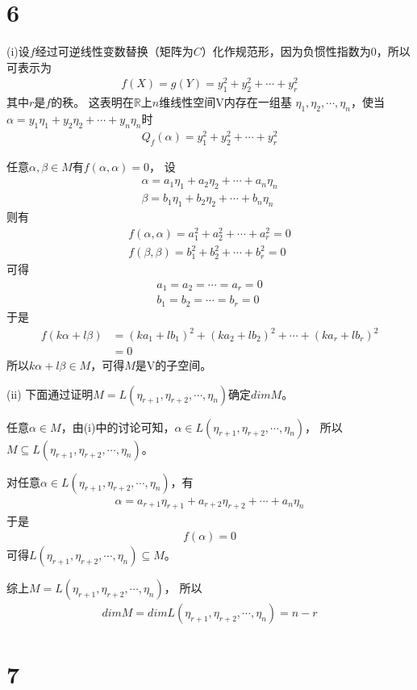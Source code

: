 \documentclass{article}
\begin{document}
\section*{6}

(i)设$f$经过可逆线性变数替换（矩阵为$C$）化作规范形，因为负惯性指数为0，所以可表示为
\begin{align*}
  f(X) = g(Y) = y_1^2 + y_2^2 + \cdots + y_r^2
\end{align*}
其中$r$是$f$的秩。
这表明在$\mathbb{R}$上$n$维线性空间V内存在一组基
$\eta_1, \eta_2, \cdots, \eta_n$，使当$\alpha = y_1 \eta_1 + y_2 \eta_2 + \cdots + y_n \eta_n$时
\begin{align*}
  Q_f(\alpha) = y_1^2 + y_2^2 + \cdots + y_r^2
\end{align*}

任意$\alpha, \beta \in M$有$f(\alpha, \alpha) = 0$，
设
\begin{align*}
  \alpha = a_1 \eta_1 + a_2 \eta_2 + \cdots + a_n \eta_n \\
  \beta = b_1 \eta_1 + b_2 \eta_2 + \cdots + b_n \eta_n
\end{align*}
则有
\begin{align*}
  f(\alpha, \alpha) = a_1^2 + a_2^2 + \cdots + a_r^2 = 0 \\
  f(\beta, \beta) = b_1^2 + b_2^2 + \cdots + b_r^2 = 0
\end{align*}
可得
\begin{align*}
  a_1 = a_2 = \cdots = a_r = 0 \\
  b_1 = b_2 = \cdots = b_r = 0
\end{align*}
于是
\begin{align*}
  f(k\alpha + l\beta)
   & = (k a_1 + l b_1)^2 + (k a_2 + l b_2)^2 + \cdots + (k a_r + l b_r)^2 \\
   & = 0
\end{align*}
所以$k \alpha + l \beta \in M$，可得$M$是V的子空间。

(ii) 下面通过证明$M = L(\eta_{r+1}, \eta_{r+2}, \cdots, \eta_n)$确定$dim M$。

任意$\alpha \in M$，由(i)中的讨论可知，$\alpha \in L(\eta_{r+1}, \eta_{r+2}, \cdots, \eta_n)$，
所以$M \subseteq L(\eta_{r+1}, \eta_{r+2}, \cdots, \eta_n)$。

对任意$\alpha \in L(\eta_{r+1}, \eta_{r+2}, \cdots, \eta_n)$，有 
\begin{align*}
  \alpha = a_{r+1} \eta_{r+1} + a_{r+2} \eta_{r+2} + \cdots + a_n \eta_n
\end{align*}
于是
\begin{align*}
  f(\alpha) = 0
\end{align*}
可得$L(\eta_{r+1}, \eta_{r+2}, \cdots, \eta_n) \subseteq M$。

综上$M = L(\eta_{r+1}, \eta_{r+2}, \cdots, \eta_n)$，
所以
\begin{align*}
  dim M = dim L(\eta_{r+1}, \eta_{r+2}, \cdots, \eta_n) = n - r
\end{align*}

\section*{7}
\end{document}
